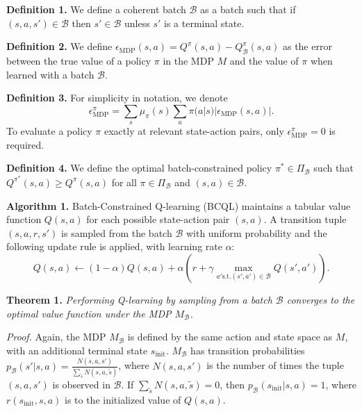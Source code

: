 \documentclass{article}
\newcommand{\e}{\epsilon}
\newcommand{\y}{\gamma}
\newcommand{\al}{\alpha}
\newcommand{\B}{\mathcal{B}}
\begin{document}
\textbf{Definition 1.} We define a coherent batch $\B$ as a batch such that if $(s,a,s') \in \B$ then $s' \in \B$ unless $s'$ is a terminal state.

\textbf{Definition 2.} We define $\e_{\text{MDP}}(s,a) = Q^\pi(s,a) - Q^\pi_\B(s,a)$ as the error between the true value of a policy $\pi$ in the MDP $M$ and the value of $\pi$ when learned with a batch $\B$. 

\textbf{Definition 3.} For simplicity in notation, we denote
\begin{equation}
    \e^\pi_{\text{MDP}} = \sum_s \mu_\pi(s) \sum_a \pi(a|s) |\e_{\text{MDP}}(s,a)|.
\end{equation}
To evaluate a policy $\pi$ exactly at relevant state-action pairs, only $\e^\pi_{\text{MDP}} = 0$ is required. 

\textbf{Definition 4.} We define the optimal batch-constrained policy $\pi^* \in \Pi_\B$ such that $Q^{\pi^*}(s,a) \geq Q^\pi(s,a)$ for all $\pi \in \Pi_\B$ and $(s,a) \in \B$. 

\bigskip

\textbf{Algorithm 1.} Batch-Constrained Q-learning (BCQL) maintains a tabular value function $Q(s,a)$ for each possible state-action pair $(s,a)$. A transition tuple $(s,a,r,s')$ is sampled from the batch $\B$ with uniform probability and the following update rule is applied, with learning rate $\al$: 
\begin{equation}
Q(s,a) \leftarrow (1 - \al) Q(s,a) + \al (r + \y \max_{a' \text{s.t.} (s',a') \in \B} Q(s',a')).
\end{equation}



\textbf{Theorem 1.} \textit{Performing Q-learning by sampling from a batch $\B$ converges to the optimal value function under the MDP $M_\B$.} 

\textit{Proof.} Again, the MDP $M_\B$ is defined by the same action and state space as $M$, with an additional terminal state $s_\text{init}$. $M_\B$ has transition probabilities $p_\B(s'|s,a) = \frac{N(s,a,s')}{\sum_{\tilde s} N(s,a,\tilde s)}$, where $N(s,a,s')$ is the number of times the tuple $(s,a,s')$ is observed in $\B$. If $\sum_{\tilde s} N(s,a,\tilde s) = 0$, then $p_\B(s_\text{init}|s,a) = 1$, where $r(s_\text{init},s,a)$ is to the initialized value of $Q(s,a)$.
\end{document}
